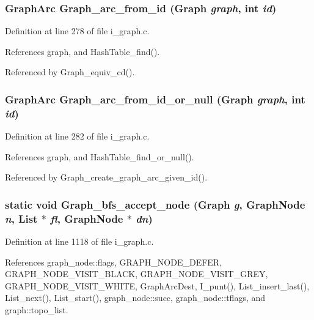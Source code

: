 \subsubsection{\setlength{\rightskip}{0pt plus 5cm}\bf{Graph\-Arc} Graph\_\-arc\_\-from\_\-id (\bf{Graph} {\em graph}, int {\em id})}\label{i__graph_8c_675eba5d8d8324e5bb6ac0e81d1a342a}




Definition at line 278 of file i\_\-graph.c.

References graph, and Hash\-Table\_\-find().

Referenced by Graph\_\-equiv\_\-cd().
\subsubsection{\setlength{\rightskip}{0pt plus 5cm}\bf{Graph\-Arc} Graph\_\-arc\_\-from\_\-id\_\-or\_\-null (\bf{Graph} {\em graph}, int {\em id})}\label{i__graph_8c_5d51d011de35944a8cae6e67a0fcad20}




Definition at line 282 of file i\_\-graph.c.

References graph, and Hash\-Table\_\-find\_\-or\_\-null().

Referenced by Graph\_\-create\_\-graph\_\-arc\_\-given\_\-id().
\subsubsection{\setlength{\rightskip}{0pt plus 5cm}static void Graph\_\-bfs\_\-accept\_\-node (\bf{Graph} {\em g}, \bf{Graph\-Node} {\em n}, \bf{List} $\ast$ {\em fl}, \bf{Graph\-Node} $\ast$ {\em dn})\hspace{0.3cm}{\tt  [static]}}\label{i__graph_8c_cd9b02ecb44e7aa490a636c20c5c1280}




Definition at line 1118 of file i\_\-graph.c.

References graph\_\-node::flags, GRAPH\_\-NODE\_\-DEFER, GRAPH\_\-NODE\_\-VISIT\_\-BLACK, GRAPH\_\-NODE\_\-VISIT\_\-GREY, GRAPH\_\-NODE\_\-VISIT\_\-WHITE, Graph\-Arc\-Dest, I\_\-punt(), List\_\-insert\_\-last(), List\_\-next(), List\_\-start(), graph\_\-node::succ, graph\_\-node::tflags, and graph::topo\_\-list.

